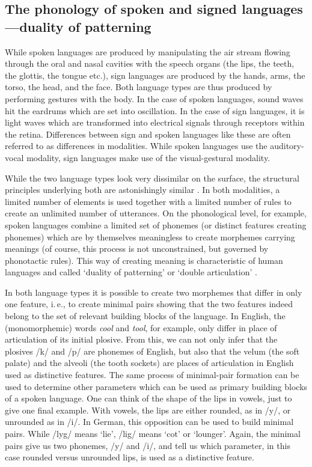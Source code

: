 \subsection{The phonology of spoken and signed languages---duality of patterning}
While spoken languages are produced by manipulating the air stream flowing through the oral and nasal cavities with the speech organs (the lips, the teeth, the glottis, the tongue etc.), sign languages are produced by the hands, arms, the torso, the head, and the face. Both language types are thus produced by performing gestures with the body. In the case of spoken languages, sound waves hit the eardrums which are set into oscillation. In the case of sign languages, it is light waves which are transformed into electrical signals through receptors within the retina. Differences between sign and spoken languages like these are often referred to as differences in modalities. While spoken languages use the auditory-vocal modality, sign languages make use of the visual-gestural modality. 

While the two language types look very dissimilar on the surface, the structural principles underlying both are astonishingly similar \citep{sandler1989phonology,brentari1998prosodic}. In both modalities, a limited number of elements is used together with a limited number of rules to create an unlimited number of utterances. On the phonological level, for example, spoken languages combine a limited set of phonemes (or distinct features creating phonemes) which are by themselves meaningless to create morphemes carrying meanings (of course, this process is not unconstrained, but governed by phonotactic rules). This way of creating meaning is characteristic of human languages and called `duality of patterning' or `double articulation' \citep{martinet1949double, hockett1960origin}.

In both language types it is possible to create two morphemes that differ in only one feature, i.\,e., to create minimal pairs showing that the two features indeed belong to the set of relevant building blocks of the language. In English, the (monomorphemic) words \textit{cool} and \textit{tool}, for example, only differ in place of articulation of its initial plosive. From this, we can not only infer that the plosives /k/ and /p/ are phonemes of English, but also that the velum (the soft palate) and the alveoli (the tooth sockets) are places of articulation in English used as distinctive features. The same process of minimal-pair formation can be used to determine other parameters which can be used as primary building blocks of a spoken language. One can think of the shape of the lips in vowels, just to give one final example. With vowels, the lips are either rounded, as in /y/, or unrounded as in /i/. In German, this opposition can be used to build minimal pairs. While /ly\textlengthmark g\textschwa / means `lie', /li\textlengthmark g\textschwa / means `cot' or `lounger'. Again, the minimal pairs give us two phonemes, /y\textlengthmark/ and /i\textlengthmark /, and tell us which parameter, in this case rounded versus unrounded lips, is used as a distinctive feature. 

